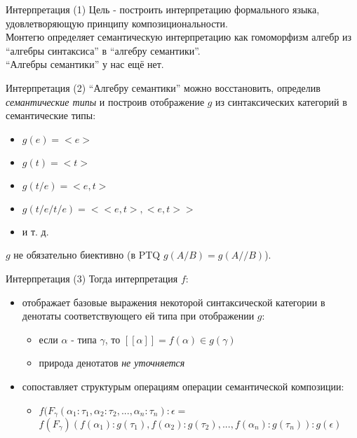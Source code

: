 \documentclass{beamer}
\begin{document}
\begin{frame}{Интерпретация (1)}
Цель - построить интерпретацию формального языка, удовлетворяющую принципу композициональности.\\
\bigskip
Монтегю определяет семантическую интерпретацию как гомоморфизм алгебр из ``алгебры синтаксиса'' в ``алгебру семантики''.\\
\bigskip
``Алгебры семантики'' у нас ещё нет.
\end{frame}

\begin{frame}{Интерпретация (2)}
``Алгебру семантики'' можно восстановить, определив \textit{семантические типы} и построив 
отображение $g$ из синтаксических категорий в семантические типы:\\
\bigskip
\begin{itemize}
  \item $g(e) = < \! e \! >$
  \item $g(t) = < \! t \! >$
  \item $g(t/e) = < \! e, t \! >$
  \item $g(t/e/t/e) = < \! < \! e, t \! >, < \! e, t \! > \! >$
  \item и т. д.
\end{itemize}
\bigskip
$g$ не обязательно биективно (в PTQ $g(A/B) = g(A//B)$).
\end{frame}

\begin{frame}{Интерпретация (3)}
Тогда интерпретация $f$:\\
\bigskip
\begin{itemize}
  \item отображает базовые выражения некоторой синтаксической категории в денотаты соответствующего ей типа при отображении $g$:
    \begin{itemize}
      \item если $\alpha$ - типа $\gamma$, то $[ \! [ \alpha ] \! ] = f(\alpha) \in g(\gamma)$
      \item природа денотатов \textit{не уточняется}
    \end{itemize}
  \item сопоставляет структурым операциям операции семантической композиции:
    \begin{itemize}
      \item $f(F_\gamma(\alpha_1 : \tau_1, \alpha_2 : \tau_2, ... , \alpha_n : \tau_n) : \epsilon =$\\
            $f(F_\gamma)(f(\alpha_1) : g(\tau_1), f(\alpha_2) : g(\tau_2), ... , f(\alpha_n) : g(\tau_n)) : g(\epsilon)$
    \end{itemize}
\end{itemize}
\end{frame}
\end{document}
